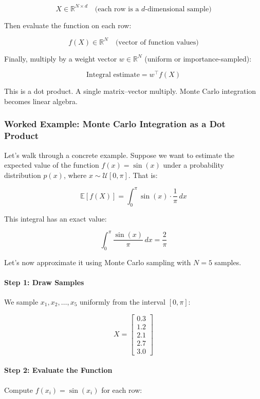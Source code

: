 \[
X \in \mathbb{R}^{N \times d} \quad \text{(each row is a $d$-dimensional sample)}
\]

Then evaluate the function on each row:

\[
f(X) \in \mathbb{R}^N \quad \text{(vector of function values)}
\]

Finally, multiply by a weight vector \( w \in \mathbb{R}^N \) (uniform or importance-sampled):

\[
\text{Integral estimate} = w^\top f(X)
\]

This is a dot product. A single matrix–vector multiply. Monte Carlo integration becomes linear algebra.


\subsubsection{Worked Example: Monte Carlo Integration as a Dot Product}

Let’s walk through a concrete example. Suppose we want to estimate the expected value of the function \( f(x) = \sin(x) \) under a probability distribution \( p(x) \), where \( x \sim \mathcal{U}[0, \pi] \). That is:

\[
\mathbb{E}[f(X)] = \int_0^\pi \sin(x) \cdot \frac{1}{\pi} \, dx
\]

This integral has an exact value:

\[
\int_0^\pi \frac{\sin(x)}{\pi} \, dx = \frac{2}{\pi}
\]

Let’s now approximate it using Monte Carlo sampling with \( N = 5 \) samples.

\paragraph{Step 1: Draw Samples}

We sample \( x_1, x_2, \ldots, x_5 \) uniformly from the interval \( [0, \pi] \):

\[
X = 
\begin{bmatrix}
0.3 \\
1.2 \\
2.1 \\
2.7 \\
3.0
\end{bmatrix}
\]

\paragraph{Step 2: Evaluate the Function}

Compute \( f(x_i) = \sin(x_i) \) for each row:

